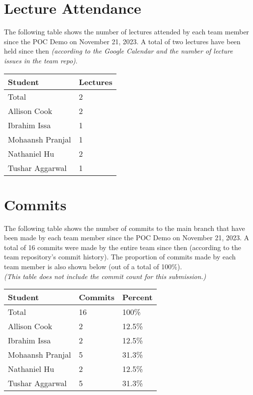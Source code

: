 \documentclass{article}
\begin{document}
\section{Lecture Attendance}

The following table shows the number of lectures attended by each team member
since the POC Demo on November 21, 2023. A total of two lectures have been held
since then \textit{(according to the Google Calendar and the number of lecture
issues in the team repo)}.

\begin{table}[H]
  \centering
  \begin{tabular}{ll}
    \toprule
    \textbf{Student} & \textbf{Lectures} \\
    \midrule
    Total & 2 \\
    Allison Cook & 2 \\
    Ibrahim Issa & 1 \\
    Mohaansh Pranjal & 1 \\
    Nathaniel Hu & 2 \\
    Tushar Aggarwal & 1 \\
    \bottomrule
  \end{tabular}
\end{table}

\section{Commits}

The following table shows the number of commits to the main branch that have
been made by each team member since the POC Demo on November 21, 2023. A total
of 16 commits were made by the entire team since then (according to the team
repository's commit history). The proportion of commits made by each team member
is also shown below (out of a total of 100\%). \\
\textit{(This table does not include the commit count for this submission.)}

\begin{table}[H]
  \centering
  \begin{tabular}{lll}
    \toprule
    \textbf{Student} & \textbf{Commits} & \textbf{Percent} \\
    \midrule
    Total & 16 & 100\% \\
    Allison Cook & 2 & 12.5\% \\
    Ibrahim Issa & 2 & 12.5\% \\
    Mohaansh Pranjal & 5 & 31.3\% \\
    Nathaniel Hu & 2 & 12.5\% \\
    Tushar Aggarwal & 5 & 31.3\% \\
    \bottomrule
  \end{tabular}
\end{table}
\end{document}
